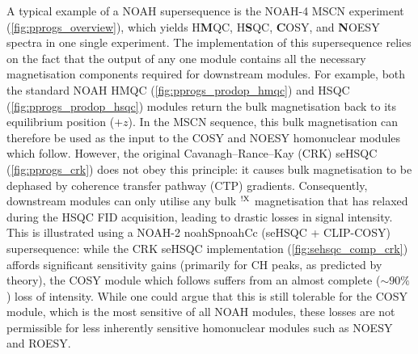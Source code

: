 \documentclass[11pt]{article}
\newcommand*{\noahtwo}[2]{\csname noah#1\endcsname\csname noah#2\endcsname}
\newcommand*{\carbon}{\ce{^{13}C}}
\newcommand*{\nitrogen}{\ce{^{15}N}}
\newcommand*{\magnnot}[1]{\ce{^1H}$^{!#1}$}
\begin{document}
A typical example of a NOAH supersequence is the NOAH-4 MSCN experiment (\cref{fig:pprogs_overview}), which yields \nitrogen{} H\textbf{M}QC, \carbon{} H\textbf{S}QC, \textbf{C}OSY, and \textbf{N}OESY spectra in one single experiment.\autocite{Kupce2017ACIE}
The implementation of this supersequence relies on the fact that the output of any one module contains all the necessary magnetisation components required for downstream modules.
For example, both the standard NOAH HMQC (\cref{fig:pprogs_prodop_hmqc})\autocite{Kupce2017ACIE, Kupce2007MRC} and HSQC (\cref{fig:pprogs_prodop_hsqc})\autocite{Kupce2017ACIE, Schulze-Sunninghausen2017JMR} modules return the bulk magnetisation back to its equilibrium position ($+z$).
In the MSCN sequence, this bulk magnetisation can therefore be used as the input to the COSY and NOESY homonuclear modules which follow.
However, the original Cavanagh--Rance--Kay (CRK) seHSQC (\cref{fig:pprogs_crk}) does not obey this principle: it causes bulk magnetisation to be dephased by coherence transfer pathway (CTP) gradients.
Consequently, downstream modules can only utilise any bulk \magnnot{\ce{X}} magnetisation that has relaxed during the HSQC FID acquisition, leading to drastic losses in signal intensity.
This is illustrated using a NOAH-2 \noahtwo{Sp}{Cc} (seHSQC + CLIP-COSY\autocite{Koos2016ACIE}) supersequence: while the CRK seHSQC implementation (\cref{fig:sehsqc_comp_crk}) affords significant sensitivity gains (primarily for CH peaks, as predicted by theory\autocite{sehsqc_sens}), the COSY module which follows suffers from an almost complete ($\sim 90\%$) loss of intensity.
While one could argue that this is still tolerable for the COSY module, which is the most sensitive of all NOAH modules, these losses are not permissible for less inherently sensitive homonuclear modules such as NOESY and ROESY.
\end{document}
